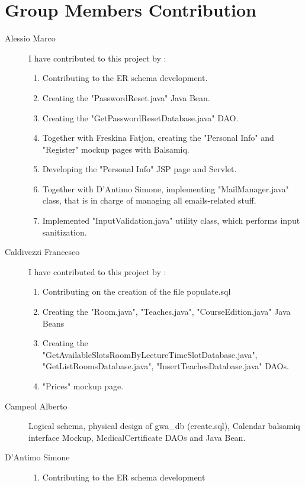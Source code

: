\section{Group Members Contribution}


\begin{description}
	\item[Alessio Marco] I have contributed to this project by :
    	\begin{enumerate}
    	    \item Contributing to the ER schema development.
    	    \item Creating the "PasswordReset.java" Java Bean.
    	    \item Creating the "GetPasswordResetDatabase.java" DAO.
    	    \item Together with Freskina Fatjon, creating the "Personal Info" and "Register" mockup pages with Balsamiq.
    	    \item Developing the "Personal Info" JSP page and Servlet.
    	    \item Together with D'Antimo Simone, implementing "MailManager.java" class, that is in charge of managing all emails-related stuff.
    	    \item Implemented "InputValidation.java" utility class, which performs input sanitization.
    	\end{enumerate}
	\item[Caldivezzi Francesco] I have contributed to this project by :
	\begin{enumerate}
		\item Contributing on the creation of the file populate.sql
		\item Creating the "Room.java", "Teaches.java", "CourseEdition.java" Java Beans
		\item Creating the "GetAvailableSlotsRoomByLectureTimeSlotDatabase.java", "GetListRoomsDatabase.java", "InsertTeachesDatabase.java" DAOs.
		\item "Prices" mockup page.		
	\end{enumerate}
	\item[Campeol Alberto] Logical schema, physical design of gwa\_db (create.sql), Calendar balsamiq interface Mockup, MedicalCertificate DAOs and Java Bean.
	\item[D'Antimo Simone] 
	\begin{enumerate}
		\item Contributing to the ER schema development

\end{enumerate}
\end{description}
